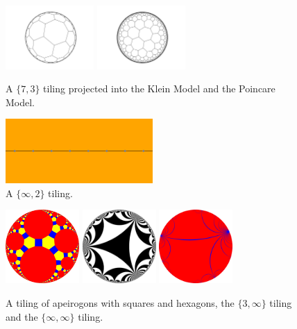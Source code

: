 \begin{figure}[h]
\centering
\includegraphics[width=0.3\textwidth]{Fig61}
\includegraphics[width=0.3\textwidth]{Fig62}
\caption{A \(\{7,3\}\) tiling projected into the Klein Model and the Poincare Model.} 
\end{figure}

\begin{figure}[h]
\centering
\includegraphics[width=0.5\textwidth]{Fig71}
\caption{A \(\{\infty,2\}\) tiling.} 
\end{figure}

\begin{figure}[h]
\centering
\includegraphics[width=0.25\textwidth]{Fig81}
\includegraphics[width=0.25\textwidth]{Fig82}
\includegraphics[width=0.25\textwidth]{Fig83}
\caption{A tiling of apeirogons with squares and hexagons, the \(\{3,\infty\}\) tiling and the \(\{\infty,\infty\}\) tiling.} 
\end{figure}

